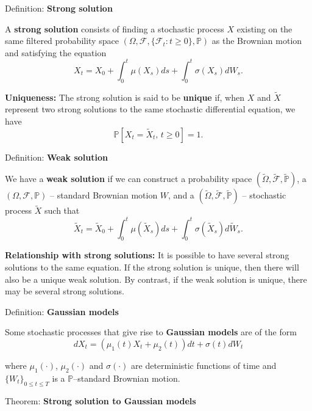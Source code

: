 \documentclass[12pt,a4paper]{article}
\begin{document}
\vspace{1em}

Definition: \textbf{Strong solution}
\vspace{0.5em}

A \textbf{strong solution} consists of finding a stochastic process $X$ existing on the same filtered probability space $(\Omega, \mathcal{F}, \{\mathcal{F}_t : t \geq 0\}, \mathbb{P})$ as the Brownian motion and satisfying the equation
\[
X_t = X_0 + \int_0^t \mu(X_s) ds + \int_0^t \sigma(X_s) dW_s.
\]

\textbf{Uniqueness:} The strong solution is said to be \textbf{unique} if, when $X$ and $\tilde{X}$ represent two strong solutions to the same stochastic differential equation, we have
\[
\mathbb{P}[X_t = \tilde{X}_t, \, t \geq 0] = 1.
\]

\vspace{1em}

Definition: \textbf{Weak solution}
\vspace{0.5em}

We have a \textbf{weak solution} if we can construct a probability space $(\tilde{\Omega}, \tilde{\mathcal{F}}, \tilde{\mathbb{P}})$, a $(\Omega, \mathcal{F}, \mathbb{P})$ – standard Brownian motion $W$, and a $(\tilde{\Omega}, \tilde{\mathcal{F}}, \tilde{\mathbb{P}})$ – stochastic process $\tilde{X}$ such that
\[
\tilde{X}_t = \tilde{X}_0 + \int_0^t \mu(\tilde{X}_s) ds + \int_0^t \sigma(\tilde{X}_s) d\tilde{W}_s.
\]

\textbf{Relationship with strong solutions:} It is possible to have several strong solutions to the same equation. If the strong solution is unique, then there will also be a unique weak solution. By contrast, if the weak solution is unique, there may be several strong solutions.

\vspace{1em}

Definition: \textbf{Gaussian models}
\vspace{0.5em}

Some stochastic processes that give rise to \textbf{Gaussian models} are of the form
\[
dX_t = (\mu_1(t) X_t + \mu_2(t)) dt + \sigma(t) dW_t \tag{13}
\]

where $\mu_1(\cdot)$, $\mu_2(\cdot)$ and $\sigma(\cdot)$ are deterministic functions of time and $\{W_t\}_{0 \leq t \leq T}$ is a $\mathbb{P}$--standard Brownian motion.

\vspace{1em}

Theorem: \textbf{Strong solution to Gaussian models}
\vspace{0.5em}
\end{document}
